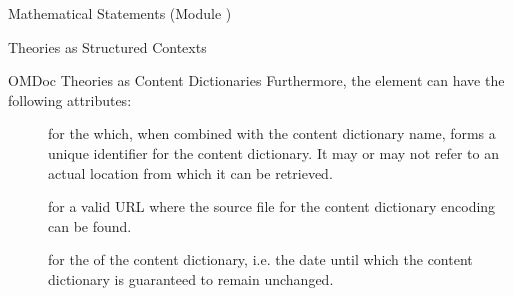 \begin{tchapter}[id=statements,short=Mathematical Statements]{Mathematical Statements (Module {})}
\begin{tsection}[id=theories]{Theories as Structured Contexts}
\begin{tsubsection}[id=identifying]{OMDoc Theories as Content Dictionaries}
Furthermore, the {} element can have the following attributes:
\begin{description}
\item[] for the {} which, when
  combined with the content dictionary name, forms a unique identifier for the content
  dictionary. It may or may not refer to an actual location from which it can be
  retrieved.
\item[] for a valid URL where the source file for the content
  dictionary encoding can be found.
\item[] for the {} of the content
  dictionary, i.e. the date until which the content dictionary is guaranteed to remain
  unchanged.
\end{description}
\end{tsubsection}

\end{tsection}
\end{tchapter}


